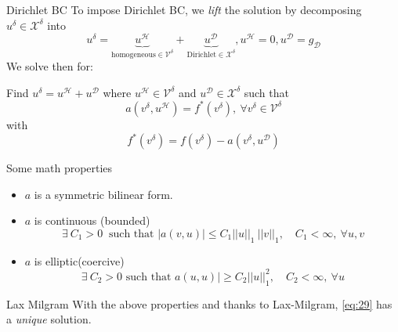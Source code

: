 \begin{frame}{Dirichlet BC}
  To impose Dirichlet BC, we \emph{lift} the solution by decomposing $u^\delta \in \mathcal{X}^\delta$  into
  \begin{equation}
    \label{eq:28}
    u^\delta = \underbrace{u^{\mathcal{H}}}_{\text{homogeneous} \in {\mathcal{V}^\delta}} + \underbrace{u^{\mathcal{D}}}_{\text{Dirichlet} \in {\mathcal{X}^\delta}}, u^{\mathcal{H}} = 0, u^{\mathcal{D}} = g_{\mathcal{D}}
  \end{equation}
  We solve then for:

  Find $u^\delta = u^{\mathcal{H}} + u^{\mathcal{D}}$ where $u^{\mathcal{H}} \in \mathcal{V}^\delta$ and $u^{\mathcal{D}} \in \mathcal{X}^\delta$ such that
  \begin{equation}
    \label{eq:29}
    a( v^\delta, u^{\mathcal{H}}) = f^*(v^\delta), \ \forall v^\delta \in \mathcal{V}^\delta
  \end{equation}
  with
  \begin{equation}
    \label{eq:30}
    f^*(v^\delta) = f(v^\delta) - a(v^\delta, u^{\mathcal{D}})
  \end{equation}
\end{frame}

\begin{frame}{Some math properties}

  \begin{itemize}
  \item $a$ is a symmetric bilinear form.
  \item $a$ is continuous (bounded)
    \begin{equation}
      \label{eq:31}
      \exists\ C_1 > 0\ \text{ such that } |a(v,u)| \leq C_1 ||u||_1\ ||v||_1,\quad C_1 < \infty,\ \forall u, v
    \end{equation}
  \item $a$ is elliptic(coercive)
    \begin{equation}
      \label{eq:32}
      \exists\ C_2 > 0 \text{ such that } a(u,u)| \geq  C_2 ||u||^2_1,\quad C_2 < \infty,\ \forall u
    \end{equation}
\end{itemize}

\begin{block}{Lax Milgram}
  With the above properties and thanks to Lax-Milgram, \eqref{eq:29} has a \emph{unique} solution.
\end{block}
\end{frame}

